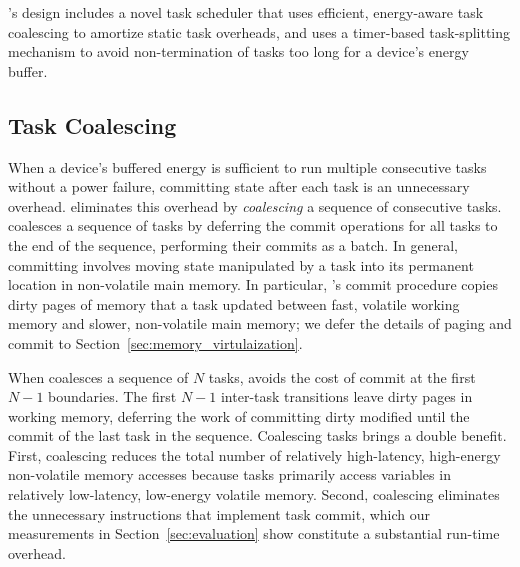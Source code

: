 \sys's design includes a novel task scheduler that uses efficient,
energy-aware task coalescing to amortize static task overheads, and uses a timer-based
task-splitting mechanism to avoid non-termination of tasks too long
for a device's energy buffer. 

\subsection{Task Coalescing}
\label{sec:task_coalescing}


When a device's buffered energy is sufficient to run multiple consecutive tasks
without a power failure, committing state after each task is an unnecessary
overhead. \sys eliminates this overhead by {\em coalescing} a sequence of
consecutive tasks. \sys coalesces a sequence of tasks by deferring the commit
operations for all tasks to the end of the sequence, performing their commits
as a batch.  In general, committing involves moving state manipulated by a task
into its permanent location in non-volatile main memory.  In particular, \sys's
commit procedure copies dirty pages of memory that a task updated between fast,
volatile working memory and slower, non-volatile main memory; we defer the
details of paging and commit to Section~\ref{sec:memory_virtulaization}.

When \sys coalesces a sequence of $N$ tasks, \sys avoids the cost of commit at
the first $N-1$ boundaries. The first $N-1$ inter-task transitions leave
dirty pages in working memory, deferring the work of committing dirty modified
until the commit of the last task in the sequence.  Coalescing tasks brings a
double benefit. First, coalescing reduces the total number of relatively
high-latency, high-energy non-volatile memory accesses because tasks primarily
access variables in relatively low-latency, low-energy volatile memory.
Second, coalescing eliminates the unnecessary instructions that implement task
commit, which our measurements in Section~\ref{sec:evaluation} show constitute
a substantial run-time overhead.

 
